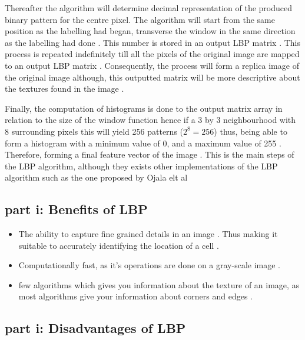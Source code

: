 \documentclass[conference]{IEEEtran}
\begin{document}
Thereafter the algorithm will determine decimal representation of the produced binary pattern for the centre pixel. The algorithm will start from the same position as the labelling had began, transverse the window in the same direction as the labelling had done \cite{b5}. This number is stored in an output LBP matrix \cite{b5}. This process is repeated indefinitely till all the pixels of the original image are mapped to an output LBP matrix \cite{b5}. Consequently, the process will form a replica image of the original image although, this outputted matrix will be more descriptive about the textures found in the image \cite{b5}. \par

Finally, the computation of histograms is done to the output matrix array in relation to the size of the window function hence if a 3 by 3 neighbourhood with 8 surrounding pixels this will yield 256 patterns ($2^{8} = 256$) thus, being able to form a histogram with a minimum value of 0, and a maximum value of 255 \cite{b5}. Therefore, forming a final feature vector of the image \cite{b5}. This is the main steps of the LBP algorithm, although they exists other implementations of the LBP algorithm such as the one proposed by Ojala elt al \cite{b5}

\subsection{part i: Benefits of LBP}
\begin{itemize}
	\item The ability to capture fine grained details in an image \cite{b5}. Thus making it suitable to accurately identifying the location of a cell \cite{b6}.
	\item Computationally fast, as it's operations are done on a gray-scale image \cite{b7} \cite{b8} \cite{b10}.
	\item few algorithms which gives you information about the texture of an image, as most algorithms give your information about corners and edges \cite{b8}.
\end{itemize}


\subsection{part i: Disadvantages of LBP}
\end{document}

